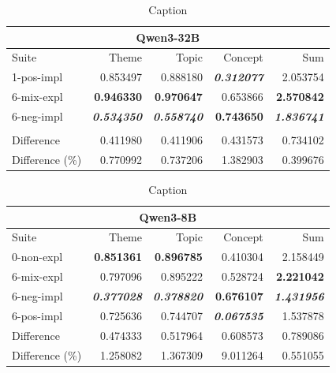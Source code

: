 \begin{table}
    \quad
    \begin{tabular}{lrrrr}
    \toprule
    \multicolumn{5}{c}{\textbf{Qwen3-32B}} \\
    \midrule
    Suite & Theme & Topic & Concept & Sum \\
    1-pos-impl & 0.853497 & 0.888180 & \bfseries \itshape 0.312077 & 2.053754 \\
    6-mix-expl & \bfseries 0.946330 & \bfseries 0.970647 & 0.653866 & \bfseries 2.570842 \\
    6-neg-impl & \bfseries \itshape 0.534350 & \bfseries \itshape 0.558740 & \bfseries 0.743650 & \bfseries \itshape 1.836741 \\
    & & & & \\
    \midrule
    Difference & 0.411980 & 0.411906 & 0.431573 & 0.734102 \\
    Difference (\%) & 0.770992 & 0.737206 & 1.382903 & 0.399676 \\
    \bottomrule
    \end{tabular}
    \quad %
    \begin{tabular}{lrrrr}
    \toprule
    \multicolumn{5}{c}{\textbf{Qwen3-8B}} \\
    \midrule
    Suite & Theme & Topic & Concept & Sum \\
    0-non-expl & \bfseries 0.851361 & \bfseries 0.896785 & 0.410304 & 2.158449 \\
    6-mix-expl & 0.797096 & 0.895222 & 0.528724 & \bfseries 2.221042 \\
    6-neg-impl & \bfseries \itshape 0.377028 & \bfseries \itshape 0.378820 & \bfseries 0.676107 & \bfseries \itshape 1.431956 \\
    6-pos-impl & 0.725636 & 0.744707 & \bfseries \itshape 0.067535 & 1.537878 \\
    \midrule
    Difference & 0.474333 & 0.517964 & 0.608573 & 0.789086 \\
    Difference (\%) & 1.258082 & 1.367309 & 9.011264 & 0.551055 \\
    \bottomrule
    \end{tabular}
    \caption{Caption}
    \label{tab:placeholder}
\end{table}